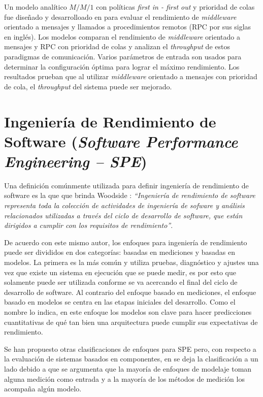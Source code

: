 \documentclass[article]{IEEEtran}
\begin{document}
Un modelo analítico $M/M/1$ con políticas \emph{first in - first out} y prioridad de colas fue diseñado y desarrolloado en \cite{alwakeel} para evaluar el rendimiento de \emph{middleware} orientado a mensajes y llamados a procedimientos remotos (RPC por sus siglas en inglés). Los modelos comparan el rendimiento de \emph{middleware} orientado a mensajes y RPC con prioridad de colas y analizan el \emph{throughput} de estos paradigmas de comunicación. Varios parámetros de entrada son usados para determinar la configuración óptima para lograr el máximo rendimiento. Los resultados prueban que al utilizar \emph{middleware} orientado a mensajes con prioridad de cola, el \emph{throughput} del sistema puede ser mejorado. 

\section{Ingeniería de Rendimiento de Software (\emph{Software Performance Engineering -- SPE})} \label{sec:spe}
Una definición comúnmente utilizada para definir ingeniería de rendimiento de software es la que que brinda Woodside \cite{woodside-et-al}: \emph{``Ingeniería de rendimiento de software representa toda la colección de actividades de ingeniería de sofware y análisis relacionados utilizadas a través del ciclo de desarrollo de software, que están dirigidos a cumplir con los requisitos de rendimiento''}. 

De acuerdo con este mismo autor, los enfoques para ingeniería de rendimiento puede ser divididos en dos categorías: basadas en mediciones y basadas en modelos. La primera es la más común y utiliza pruebas, diagnóstico y ajustes una vez que existe un sistema en ejecución que se puede medir, es por esto que solamente puede ser utilizada conforme se va acercando el final del ciclo de desarrollo de software. Al contrario del enfoque basado en mediciones, el enfoque basado en modelos se centra en las etapas iniciales del desarrollo. Como el nombre lo indica, en este enfoque los modelos son clave para hacer predicciones cuantitativas de qué tan bien una arquitectura puede cumplir sus expectativas de rendimiento.

Se han propuesto otras clasificaciones de enfoques para SPE pero, con respecto a la evaluación de sistemas basados en componentes, en \cite{performance-model-survey} se deja la clasificación a un lado debido a que se argumenta que la mayoría de enfoques de modelaje toman alguna medición como entrada y a la mayoría de los métodos de medición los acompaña algún modelo.
\end{document}
